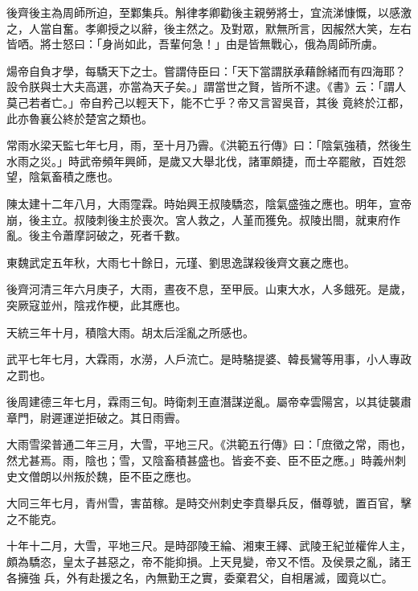 \begin{pinyinscope}
 後齊後主為周師所迫，至鄴集兵。斛律孝卿勸後主親勞將士，宜流涕慷慨，以感激之，人當自奮。孝卿授之以辭，後主然之。及對眾，默無所言，因赧然大笑，左右皆哂。將士怒曰：「身尚如此，吾輩何急！」由是皆無戰心，俄為周師所虜。



 煬帝自負才學，每驕天下之士。嘗謂侍臣曰：「天下當謂朕承藉餘緒而有四海耶？設令朕與士大夫高選，亦當為天子矣。」謂當世之賢，皆所不逮。《書》云：「謂人莫己若者亡。」帝自矜己以輕天下，能不亡乎？帝又言習吳音，其後
 竟終於江都，此亦魯襄公終於楚宮之類也。



 常雨水梁天監七年七月，雨，至十月乃霽。《洪範五行傳》曰：「陰氣強積，然後生水雨之災。」時武帝頻年興師，是歲又大舉北伐，諸軍頗捷，而士卒罷敝，百姓怨望，陰氣畜積之應也。



 陳太建十二年八月，大雨霪霖。時始興王叔陵驕恣，陰氣盛強之應也。明年，宣帝崩，後主立。叔陵刺後主於喪次。宮人救之，人堇而獲免。叔陵出閤，就東府作亂。後主令蕭摩訶破之，死者千數。



 東魏武定五年秋，大雨七十餘日，元瑾、劉思逸謀殺後齊文襄之應也。



 後齊河清三年六月庚子，大雨，晝夜不息，至甲辰。山東大水，人多餓死。是歲，突厥寇並州，陰戎作梗，此其應也。



 天統三年十月，積陰大雨。胡太后淫亂之所感也。



 武平七年七月，大霖雨，水澇，人戶流亡。是時駱提婆、韓長鸞等用事，小人專政之罰也。



 後周建德三年七月，霖雨三旬。時衛刺王直潛謀逆亂。屬帝幸雲陽宮，以其徒襲肅章門，尉遲運逆拒破之。其日雨霽。



 大雨雪梁普通二年三月，大雪，平地三尺。《洪範五行傳》曰：「庶徵之常，雨也，然尤甚焉。雨，陰也；雪，又陰畜積甚盛也。皆妾不妾、臣不臣之應。」時義州刺史文僧朗以州叛於魏，臣不臣之應也。



 大同三年七月，青州雪，害苗稼。是時交州刺史李賁舉兵反，僭尊號，置百官，擊之不能克。



 十年十二月，大雪，平地三尺。是時邵陵王綸、湘東王繹、武陵王紀並權侔人主，頗為驕恣，皇太子甚惡之，帝不能抑損。上天見變，帝又不悟。及侯景之亂，諸王各擁強
 兵，外有赴援之名，內無勤王之實，委棄君父，自相屠滅，國竟以亡。




\end{pinyinscope}
